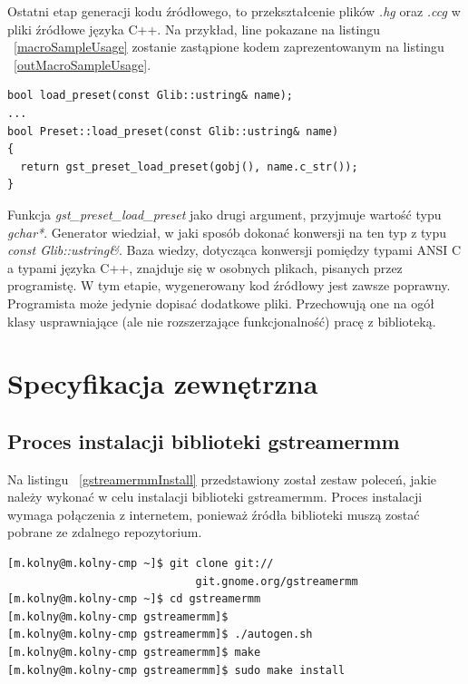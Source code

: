 \documentclass[12pt]{article}
\begin{document}
Ostatni etap generacji kodu źródłowego, to przekształcenie plików \textit{.hg} oraz \textit{.ccg} w pliki źródłowe języka C++. Na przykład, line pokazane na listingu ~\ref{macroSampleUsage} zostanie zastąpione kodem zaprezentowanym na listingu ~\ref{outMacroSampleUsage}.
    \begin{lstlisting}[caption=Kod źródłowy wygenerowany na podstawie makrodefinicji, label=outMacroSampleUsage]
bool load_preset(const Glib::ustring& name);
...
bool Preset::load_preset(const Glib::ustring& name)
{
  return gst_preset_load_preset(gobj(), name.c_str());
}
    \end{lstlisting}
    Funkcja \textit{gst\_preset\_load\_preset} jako drugi argument, przyjmuje wartość typu \textit{gchar*}. Generator wiedział, w jaki sposób dokonać konwersji na ten typ z typu \textit{const Glib::ustring\&}. Baza wiedzy, dotycząca konwersji pomiędzy typami ANSI C a typami języka C++, znajduje się w osobnych plikach, pisanych przez programistę.
W tym etapie, wygenerowany kod źródłowy jest zawsze poprawny. Programista może jedynie dopisać dodatkowe pliki. Przechowują one na ogół klasy usprawniające (ale nie rozszerzające funkcjonalność) pracę z biblioteką.
\cleardoublepage
\section{Specyfikacja zewnętrzna}
\subsection{Proces instalacji biblioteki gstreamermm}
Na listingu ~\ref{gstreamermmInstall} przedstawiony został zestaw poleceń, jakie należy wykonać w celu instalacji biblioteki gstreamermm. Proces instalacji wymaga połączenia z internetem, ponieważ źródła biblioteki muszą zostać pobrane ze zdalnego repozytorium.
\begin{lstlisting}[caption=Polecenia kompilujące program gst-creator, label=gstreamermmInstall]
[m.kolny@m.kolny-cmp ~]$ git clone git://
                             git.gnome.org/gstreamermm
[m.kolny@m.kolny-cmp ~]$ cd gstreamermm
[m.kolny@m.kolny-cmp gstreamermm]$ 
[m.kolny@m.kolny-cmp gstreamermm]$ ./autogen.sh
[m.kolny@m.kolny-cmp gstreamermm]$ make
[m.kolny@m.kolny-cmp gstreamermm]$ sudo make install
\end{lstlisting}
\end{document}

